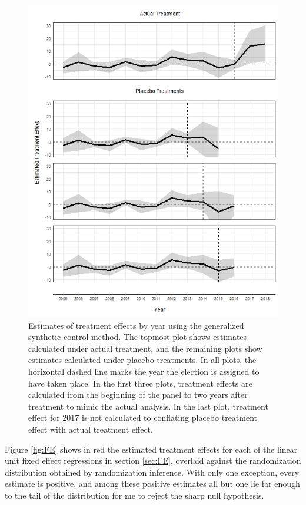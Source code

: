\documentclass[12pt]{article}\usepackage[]{graphicx}\usepackage[]{color}
\newcommand{\1}{\mathbbm{1}}
\begin{document}
\begin{figure}[!htbp]
	\centering
	\includegraphics[width=\textwidth]{figure/181228_synth_results.png}
	\captionsetup{singlelinecheck=off}
	\caption[Estimated synthetic control treatment effects]{Estimates of treatment effects by year using the generalized synthetic control method. The topmost plot shows estimates calculated under actual treatment, and the remaining plots show estimates calculated under placebo treatments. In all plots, the horizontal dashed line marks the year the election is assigned to have taken place. In the first three plots, treatment effects are calculated from the beginning of the panel to two years after treatment to mimic the actual analysis. In the last plot, treatment effect for 2017 is not calculated to conflating placebo treatment effect with actual treatment effect.}
	\label{fig:synth_placebo}
\end{figure}


Figure \ref{fig:FE} shows in red the estimated treatment effects for each of the linear unit fixed effect regressions in section \ref{sec:FE}, overlaid against the randomization distribution obtained by randomization inference. With only one exception, every estimate is positive, and among these positive estimates all but one  lie far enough to the tail of the distribution for me to reject the sharp null hypothesis. 
\end{document}
